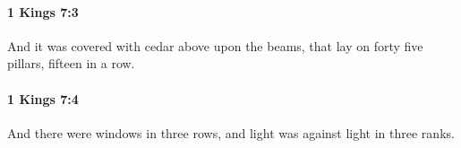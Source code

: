 		\paragraph{1 Kings 7:3} %
			\label{1KINGS-7-3}

			And it was covered with cedar above upon the beams, that lay on forty five pillars, fifteen in a row.


		\paragraph{1 Kings 7:4} %
			\label{1KINGS-7-4}

			And there were windows in three rows, and light was against light in three ranks.



